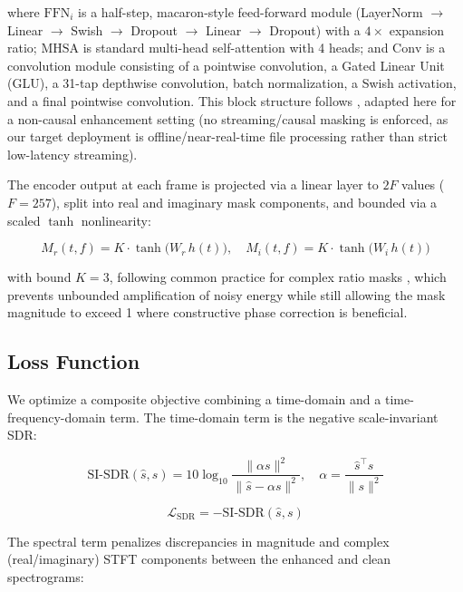 \documentclass[conference]{IEEEtran}
\begin{document}
where $\text{FFN}_i$ is a half-step, macaron-style feed-forward module (LayerNorm $\to$
Linear $\to$ Swish $\to$ Dropout $\to$ Linear $\to$ Dropout) with a $4\times$ expansion
ratio; $\text{MHSA}$ is standard multi-head self-attention with 4 heads; and $\text{Conv}$
is a convolution module consisting of a pointwise convolution, a Gated Linear Unit (GLU), a
31-tap depthwise convolution, batch normalization, a Swish activation, and a final pointwise
convolution. This block structure follows \cite{gulati2020conformer}, adapted here for a
non-causal enhancement setting (no streaming/causal masking is enforced, as our target
deployment is offline/near-real-time file processing rather than strict low-latency
streaming).

The encoder output at each frame is projected via a linear layer to $2F$ values
($F{=}257$), split into real and imaginary mask components, and bounded via a scaled
$\tanh$ nonlinearity:

\begin{equation}
M_r(t,f) = K \cdot \tanh\big(W_r \, h(t) \big), \quad
M_i(t,f) = K \cdot \tanh\big(W_i \, h(t)\big)
\end{equation}

with bound $K{=}3$, following common practice for complex ratio masks
\cite{williamson2015complex}, which prevents unbounded amplification of noisy energy while
still allowing the mask magnitude to exceed 1 where constructive phase correction is
beneficial.

\subsection{Loss Function}
\label{sec:loss}

We optimize a composite objective combining a time-domain and a time-frequency-domain term.
The time-domain term is the negative scale-invariant SDR:

\begin{equation}
\text{SI-SDR}(\hat{s}, s) = 10\log_{10}
\frac{\|\alpha s\|^2}{\|\hat{s} - \alpha s\|^2}, \quad
\alpha = \frac{\hat{s}^\top s}{\|s\|^2}
\end{equation}

\begin{equation}
\mathcal{L}_{\text{SDR}} = -\text{SI-SDR}(\hat{s}, s)
\end{equation}

The spectral term penalizes discrepancies in magnitude and complex (real/imaginary) STFT
components between the enhanced and clean spectrograms:
\end{document}
